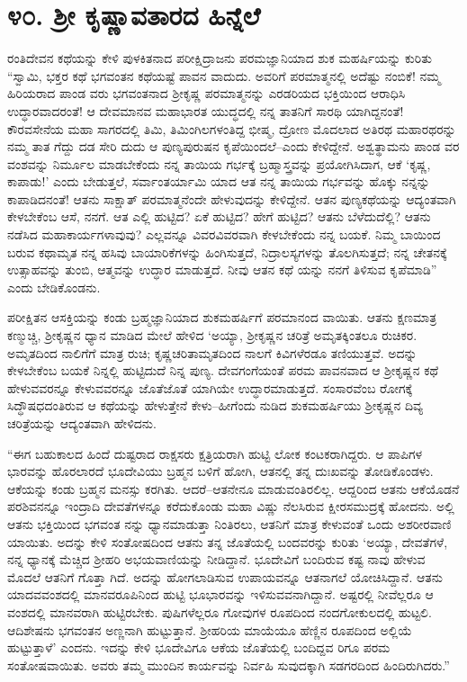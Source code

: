 
\chapter{೪೦. ಶ್ರೀ ಕೃಷ್ಣಾವತಾರದ ಹಿನ್ನೆಲೆ}

ರಂತಿದೇವನ ಕಥೆಯನ್ನು ಕೇಳಿ ಪುಳಕಿತನಾದ ಪರೀಕ್ಷಿದ್ರಾಜನು ಪರಮಜ್ಞಾನಿಯಾದ ಶುಕ ಮಹರ್ಷಿಯನ್ನು ಕುರಿತು “ಸ್ವಾಮಿ, ಭಕ್ತರ ಕಥೆ ಭಗವಂತನ ಕಥೆಯಷ್ಟೆ ಪಾವನ ವಾದುದು. ಅವರಿಗೆ ಪರಮಾತ್ಮನಲ್ಲಿ ಅದೆಷ್ಟು ನಂಬಿಕೆ! ನಮ್ಮ ಹಿರಿಯರಾದ ಪಾಂಡ ವರು ಭಗವಂತನಾದ ಶ್ರೀಕೃಷ್ಣ ಪರಮಾತ್ಮನನ್ನು ಎರಡರಿಯದ ಭಕ್ತಿಯಿಂದ ಆರಾಧಿಸಿ ಉದ್ಧಾರವಾದರಂತೆ! ಆ ದೇವಮಾನವ ಮಹಾಭಾರತ ಯುದ್ಧದಲ್ಲಿ ನನ್ನ ತಾತನಿಗೆ ಸಾರಥಿ ಯಾಗಿದ್ದನಂತೆ! ಕೌರವಸೇನೆಯ ಮಹಾ ಸಾಗರದಲ್ಲಿ ತಿಮಿ, ತಿಮಿಂಗಿಲಗಳಂತಿದ್ದ ಭೀಷ್ಮ, ದ್ರೋಣ ಮೊದಲಾದ ಅತಿರಥ ಮಹಾರಥರನ್ನು ನಮ್ಮ ತಾತ ಗೆದ್ದು ದಡ ಸೇರಿ ದುದು ಆ ಪುಣ್ಯಪುರುಷನ ಕೃಪೆಯಿಂದಲೆ–ಎಂದು ಕೇಳಿದ್ದೇನೆ. ಅಶ್ವತ್ಥಾಮನು ಪಾಂಡ ವರ ವಂಶವನ್ನು ನಿರ್ಮೂಲ ಮಾಡಬೇಕೆಂದು ನನ್ನ ತಾಯಿಯ ಗರ್ಭಕ್ಕೆ ಬ್ರಹ್ಮಾಸ್ತ್ರವನ್ನು ಪ್ರಯೋಗಿಸಿದಾಗ, ಆಕೆ ‘ಕೃಷ್ಣ, ಕಾಪಾಡು!’ ಎಂದು ಬೇಡುತ್ತಲೆ, ಸರ್ವಾಂತರ್ಯಾಮಿ ಯಾದ ಆತ ನನ್ನ ತಾಯಿಯ ಗರ್ಭವನ್ನು ಹೊಕ್ಕು ನನ್ನನ್ನು ಕಾಪಾಡಿದನಂತೆ! ಆತನು ಸಾಕ್ಷಾತ್ ಪರಮಾತ್ಮನೆಂದೇ ಹೇಳುವುದನ್ನು ಕೇಳಿದ್ದೇನೆ. ಆತನ ಪುಣ್ಯಕಥೆಯನ್ನು ಆದ್ಯಂತವಾಗಿ ಕೇಳಬೇಕೆಂಬ ಆಸೆ, ನನಗೆ. ಆತ ಎಲ್ಲಿ ಹುಟ್ಟಿದ? ಏಕೆ ಹುಟ್ಟಿದ? ಹೇಗೆ ಹುಟ್ಟಿದ? ಆತನು ಬೆಳೆದುದೆಲ್ಲಿ? ಆತನು ನಡೆಸಿದ ಮಹಾಕಾರ್ಯಗಳಾವುವು? ಎಲ್ಲವನ್ನೂ ವಿವರವಿವರವಾಗಿ ಕೇಳಬೇಕೆಂದು ನನ್ನ ಬಯಕೆ. ನಿಮ್ಮ ಬಾಯಿಂದ ಬರುವ ಕಥಾಮೃತ ನನ್ನ ಹಸಿವು ಬಾಯಾರಿಕೆಗಳನ್ನು ಹಿಂಗಿಸುತ್ತದೆ, ನಿದ್ರಾಲಸ್ಯಗಳನ್ನು ತೊಲಗಿಸುತ್ತದೆ; ನನ್ನ ಚೇತನಕ್ಕೆ ಉತ್ಸಾಹವನ್ನು ತುಂಬಿ, ಆತ್ಮವನ್ನು ಉದ್ಧಾರ ಮಾಡುತ್ತದೆ. ನೀವು ಆತನ ಕಥೆ ಯನ್ನು ನನಗೆ ತಿಳಿಸುವ ಕೃಪೆಮಾಡಿ” ಎಂದು ಬೇಡಿಕೊಂಡನು. 

ಪರೀಕ್ಷಿತನ ಆಸಕ್ತಿಯನ್ನು ಕಂಡು ಬ್ರಹ್ಮಜ್ಞಾನಿಯಾದ ಶುಕಮಹರ್ಷಿಗೆ ಪರಮಾನಂದ ವಾಯಿತು. ಆತನು ಕ್ಷಣಮಾತ್ರ ಕಣ್ಮುಚ್ಚಿ, ಶ್ರೀಕೃಷ್ಣನ ಧ್ಯಾನ ಮಾಡಿದ ಮೇಲೆ ಹೇಳಿದ ‘ಅಯ್ಯಾ, ಶ್ರೀಕೃಷ್ಣನ ಚರಿತ್ರೆ ಅಮೃತಕ್ಕಿಂತಲೂ ರುಚಿಕರ. ಅಮೃತದಿಂದ ನಾಲಿಗೆಗೆ ಮಾತ್ರ ರುಚಿ; ಕೃಷ್ಣಚರಿತಾಮೃತದಿಂದ ನಾಲಗೆ ಕಿವಿಗಳೆರಡೂ ತಣಿಯುತ್ತವೆ. ಅದನ್ನು ಕೇಳಬೇಕೆಂಬ ಬಯಕೆ ನಿನ್ನಲ್ಲಿ ಹುಟ್ಟಿದುದೆ ನಿನ್ನ ಪುಣ್ಯ. ದೇವಗಂಗೆಯಂತೆ ಪರಮ ಪಾವನವಾದ ಆ ಶ್ರೀಕೃಷ್ಣನ ಕಥೆ ಹೇಳುವವರನ್ನೂ ಕೇಳುವವರನ್ನೂ ಜೊತೆಜೊತೆ ಯಾಗಿಯೇ ಉದ್ಧಾರಮಾಡುತ್ತದೆ. ಸಂಸಾರವೆಂಬ ರೋಗಕ್ಕೆ ಸಿದ್ಧೌಷಧದಂತಿರುವ ಆ ಕಥೆಯನ್ನು ಹೇಳುತ್ತೇನೆ ಕೇಳು–ಹೀಗೆಂದು ನುಡಿದ ಶುಕಮಹರ್ಷಿಯು ಶ್ರೀಕೃಷ್ಣನ ದಿವ್ಯ ಚರಿತ್ರೆಯನ್ನು ಆದ್ಯಂತವಾಗಿ ಹೇಳಿದನು.

“ಈಗ ಬಹುಕಾಲದ ಹಿಂದೆ ದುಷ್ಟರಾದ ರಾಕ್ಷಸರು ಕ್ಷತ್ರಿಯರಾಗಿ ಹುಟ್ಟಿ ಲೋಕ ಕಂಟಕರಾಗಿದ್ದರು. ಆ ಪಾಪಿಗಳ ಭಾರವನ್ನು ಹೊರಲಾರದೆ ಭೂದೇವಿಯು ಬ್ರಹ್ಮನ ಬಳಿಗೆ ಹೋಗಿ, ಆತನಲ್ಲಿ ತನ್ನ ದುಃಖವನ್ನು ತೋಡಿಕೊಂಡಳು. ಆಕೆಯನ್ನು ಕಂಡು ಬ್ರಹ್ಮನ ಮನಸ್ಸು ಕರಗಿತು. ಆದರೆ–ಆತನೇನೂ ಮಾಡುವಂತಿರಲಿಲ್ಲ. ಆದ್ದರಿಂದ ಆತನು ಆಕೆಯೊಡನೆ ಪರಶಿವನನ್ನೂ ಇಂದ್ರಾದಿ ದೇವತೆಗಳನ್ನೂ ಕರೆದುಕೊಂಡು ಮಹಾ ವಿಷ್ಣು ನೆಲಸಿರುವ ಕ್ಷೀರಸಮುದ್ರಕ್ಕೆ ಹೋದನು. ಅಲ್ಲಿ ಆತನು ಭಕ್ತಿಯಿಂದ ಭಗವಂತ ನನ್ನು ಧ್ಯಾನಮಾಡುತ್ತಾ ನಿಂತಿರಲು, ಆತನಿಗೆ ಮಾತ್ರ ಕೇಳುವಂತೆ ಒಂದು ಅಶರೀರವಾಣಿ ಯಾಯಿತು. ಅದನ್ನು ಕೇಳಿ ಸಂತೋಷದಿಂದ ಆತನು ತನ್ನ ಜೊತೆಯಲ್ಲಿ ಬಂದವರನ್ನು ಕುರಿತು ‘ಅಯ್ಯಾ, ದೇವತೆಗಳೆ, ನನ್ನ ಧ್ಯಾನಕ್ಕೆ ಮೆಚ್ಚಿದ ಶ್ರೀಹರಿ ಅಭಯವಾಣಿಯನ್ನು ನೀಡಿದ್ದಾನೆ. ಭೂದೇವಿಗೆ ಬಂದಿರುವ ಕಷ್ಟ ನಾವು ಹೇಳುವ ಮೊದಲೆ ಆತನಿಗೆ ಗೊತ್ತಾ ಗಿದೆ. ಅದನ್ನು ಹೋಗಲಾಡಿಸುವ ಉಪಾಯವನ್ನೂ ಆತನಾಗಲೆ ಯೋಚಿಸಿದ್ದಾನೆ. ಆತನು ಯಾದವವಂಶದಲ್ಲಿ ಮಾನವರೂಪಿನಿಂದ ಹುಟ್ಟಿ ಭೂಭಾರವನ್ನು ಇಳಿಸುವವನಾಗಿದ್ದಾನೆ. ಅಷ್ಟರಲ್ಲಿ ನೀವೆಲ್ಲರೂ ಆ ವಂಶದಲ್ಲಿ ಮಾನವರಾಗಿ ಹುಟ್ಟಿರಬೇಕು. ಪುಷಿಗಳೆಲ್ಲರೂ ಗೋವುಗಳ ರೂಪದಿಂದ ನಂದಗೋಕುಲದಲ್ಲಿ ಹುಟ್ಟಲಿ. ಆದಿಶೇಷನು ಭಗವಂತನ ಅಣ್ಣನಾಗಿ ಹುಟ್ಟುತ್ತಾನೆ. ಶ್ರೀಹರಿಯ ಮಾಯೆಯೂ ಹೆಣ್ಣಿನ ರೂಪದಿಂದ ಅಲ್ಲಿಯೆ ಹುಟ್ಟುತ್ತಾಳೆ’ ಎಂದನು. ಇದನ್ನು ಕೇಳಿ ಭೂದೇವಿಗೂ ಆಕೆಯ ಜೊತೆಯಲ್ಲಿ ಬಂದಿದ್ದವ ರಿಗೂ ಪರಮ ಸಂತೋಷವಾಯಿತು. ಅವರು ತಮ್ಮ ಮುಂದಿನ ಕಾರ್ಯವನ್ನು ನಿರ್ವಹಿ ಸುವುದಕ್ಕಾಗಿ ಸಡಗರದಿಂದ ಹಿಂದಿರುಗಿದರು.”

